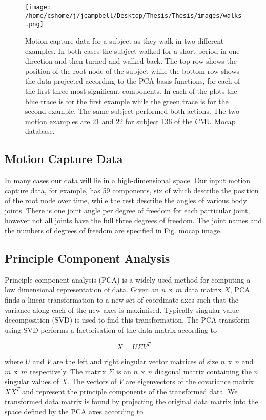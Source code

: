 \begin{figure}
\texttt{[image: /home/cshome/j/jcampbell/Desktop/Thesis/Thesis/images/walks.png]}
\caption{Motion capture data for a subject as they walk in two different examples. In both cases the subject walked for a short period in one direction and then turned and walked back. The top row shows the position of the root node of the subject while the bottom row shows the data projected according to the PCA basis functions, for each of the first three most significant components. In each of the plots the blue trace is for the first example while the green trace is for the second example. The same subject performed both actions. The two motion examples are 21 and 22 for subject 136 of the CMU Mocap database. \label{walks}}
\end{figure}

\subsection{Motion Capture Data}

In many cases our data will lie in a high-dimensional space. Our input motion capture data, for example, has 59 components, six of which describe the position of the root node over time, while the rest describe the angles of various body joints. There is one joint angle per degree of freedom for each particular joint, however not all joints have the full three degrees of freedom. The joint names and the numbers of degrees of freedom are specified in Fig. {mocap image}.

\subsection{Principle Component Analysis}

Principle component analysis (PCA) is a widely used method for computing a low dimensional representation of data. Given an $n\:\:\text{x}\:\:m$ data matrix $X$, PCA finds a linear transformation to a new set of coordinate axes such that the variance along each of the new axes is maximised. Typically singular value decomposition (SVD) is used to find this transformation. The PCA transform using SVD performs a factorisation of the data matrix according to

\begin{equation}
X = U \Sigma V^{T} 
\end{equation}

\noindent where $U$ and $V$ are the left and right singular vector matrices of size $n\:\:\text{x}\:\:n$ and $m\:\:\text{x}\:\:m$ respectively. The matrix $\Sigma$ is an $n\:\:\text{x}\:\:n$ diagonal matrix containing the $n$ singular values of $X$. The vectors of $V$ are eigenvectors of the covariance matrix $X X^{T}$ and represent the principle components of the transformed data. We transformed data matrix is found by projecting the original data matrix into the space defined by the PCA axes according to

